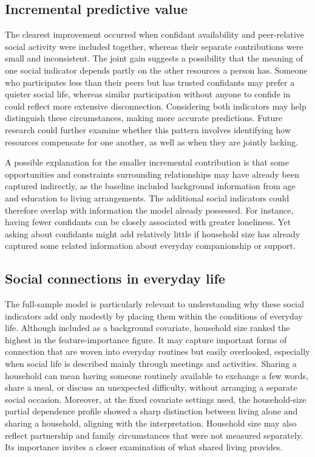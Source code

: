 \documentclass[12pt]{article}
\begin{document}
\subsection{Incremental predictive value}

The clearest improvement occurred when confidant availability and peer-relative social
activity were included together, whereas their separate contributions were small and
inconsistent. The joint gain suggests a possibility that the meaning of one social
indicator depends partly on the other resources a person has. Someone who participates
less than their peers but has trusted confidants may prefer a quieter social life,
whereas similar participation without anyone to confide in could reflect more extensive
disconnection. Considering both indicators may help distinguish these circumstances,
making more accurate predictions. Future research could further examine whether this
pattern involves identifying how resources compensate for one another, as well as when
they are jointly lacking.

A possible explanation for the smaller incremental contribution is that some
opportunities and constraints surrounding relationships may have already been captured
indirectly, as the baseline included background information from age and education to
living arrangements. The additional social indicators could therefore overlap with
information the model already possessed. For instance, having fewer confidants can be
closely associated with greater loneliness. Yet asking about confidants might add
relatively little if household size has already captured some related information about
everyday companionship or support.

\subsection{Social connections in everyday life}

The full-sample model is particularly relevant to understanding why these social
indicators add only modestly by placing them within the conditions of everyday life.
Although included as a background covariate, household size ranked the highest in the
feature-importance figure. It may capture important forms of connection that are woven
into everyday routines but easily overlooked, especially when social life is described
mainly through meetings and activities. Sharing a household can mean having someone
routinely available to exchange a few words, share a meal, or discuss an unexpected
difficulty, without arranging a separate social occasion. Moreover, at the fixed
covariate settings used, the household-size partial dependence profile showed a sharp
distinction between living alone and sharing a household, aligning with the
interpretation. Household size may also reflect partnership and family circumstances
that were not measured separately. Its importance invites a closer examination of what
shared living provides.
\end{document}
